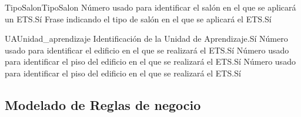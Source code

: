 \begin{cdtEntidad}{TipoSalon}{TipoSalon}
	{Número usado para identificar el salón en el que se aplicará un ETS.}{Sí}
	{Frase indicando el tipo de salón en el que se aplicará el ETS.}{Sí}
\end{cdtEntidad}
\begin{cdtEntidad}{UA}{Unidad\_aprendizaje}
	{Identificación de la Unidad de Aprendizaje.}{Sí}
	{Número usado para identificar el edificio en el que se realizará el ETS.}{Sí}
	{Número usado para identificar el piso del edificio en el que se realizará el ETS.}{Sí}
	{Número usado para identificar el piso del edificio en el que se realizará el ETS.}{Sí}
	\cdtEntityRelSection
\end{cdtEntidad}
\subsection{Modelado de Reglas de negocio}




